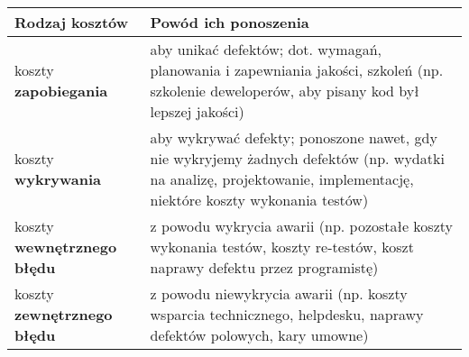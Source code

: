 \documentclass[../main.tex]{subfiles}
\begin{document}
    \begin{table}[H]
        \begin{center}
            \begin{tabular}{| p{5cm} || p{11cm} |}
                \hline
                \textbf{Rodzaj kosztów}            & \textbf{Powód ich ponoszenia}                                                                                                                                      \\
                \hline
                \hline
                koszty \textbf{zapobiegania}       & aby unikać defektów; dot. wymagań, planowania i zapewniania jakości, szkoleń (np. szkolenie deweloperów, aby pisany kod był lepszej jakości)                       \\
                \hline
                koszty \textbf{wykrywania}         & aby wykrywać defekty; ponoszone nawet, gdy nie wykryjemy żadnych defektów (np. wydatki na analizę, projektowanie, implementację, niektóre koszty wykonania testów) \\
                \hline
                koszty \textbf{wewnętrznego błędu} & z powodu wykrycia awarii (np. pozostałe koszty wykonania testów, koszty re-testów, koszt naprawy defektu przez programistę)                                        \\
                \hline
                koszty \textbf{zewnętrznego błędu} & z powodu niewykrycia awarii (np. koszty wsparcia technicznego, helpdesku, naprawy defektów polowych, kary umowne)                                                  \\
                \hline
            \end{tabular}
        \end{center}
    \end{table}
\end{document}
